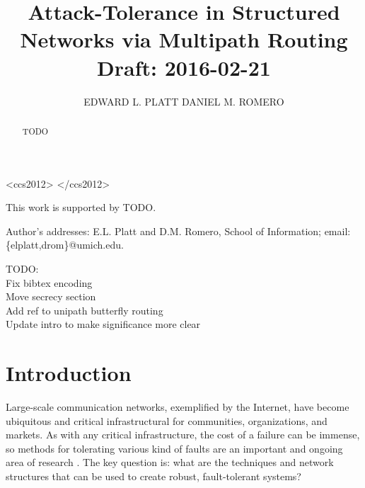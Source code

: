 \documentclass[prodmode,permissions]{acmsmall-ec16}
\begin{document}

\title{
Attack-Tolerance in Structured Networks via Multipath Routing
\\ Draft: 2016-02-21
}
\author{EDWARD L. PLATT
DANIEL M. ROMERO
}

\begin{abstract}
TODO
\end{abstract}


\begin{CCSXML}
<ccs2012>
</ccs2012>  
\end{CCSXML}




\begin{bottomstuff}
This work is supported by TODO.

Author's addresses: E.L. Platt and D.M. Romero, School of Information; email: \{elplatt,drom\}@umich.edu.
\end{bottomstuff}

\maketitle

TODO:\\
Fix bibtex encoding\\
Move secrecy section\\
Add ref to unipath butterfly routing\\
Update intro to make significance more clear\\

\section{Introduction}

Large-scale communication networks, exemplified by the Internet,
have become ubiquitous and critical infrastructural for
communities, organizations, and markets.
As with any critical infrastructure, the cost of a failure can be
immense, so methods for tolerating various kind of faults are an
important and ongoing area of research
\cite{zin_survey_2015,albert_error_2000,sterbenz_resilience_2010}.
The key question is: what are the techniques and network structures that can
be used to create robust, fault-tolerant systems?
\end{document}
